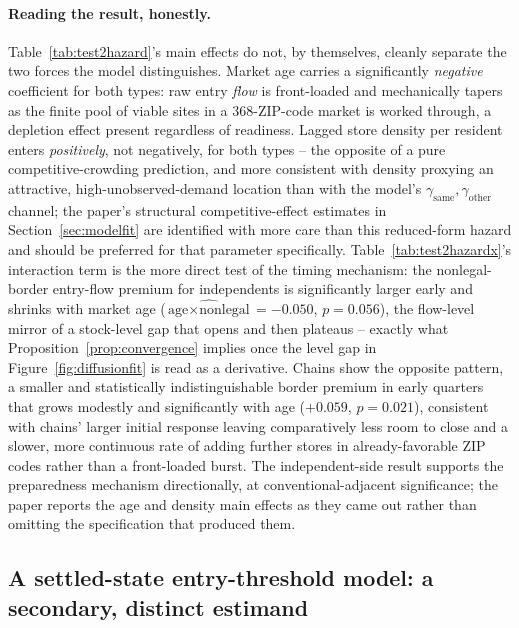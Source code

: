 \documentclass[english,12pt]{article}
\begin{document}
\paragraph{Reading the result, honestly.} Table~\ref{tab:test2hazard}'s main effects do not, by themselves, cleanly separate the two forces the model distinguishes. Market age carries a significantly \emph{negative} coefficient for both types: raw entry \emph{flow} is front-loaded and mechanically tapers as the finite pool of viable sites in a 368-ZIP-code market is worked through, a depletion effect present regardless of readiness. Lagged store density per resident enters \emph{positively}, not negatively, for both types -- the opposite of a pure competitive-crowding prediction, and more consistent with density proxying an attractive, high-unobserved-demand location than with the model's $\gamma_{\text{same}},\gamma_{\text{other}}$ channel; the paper's structural competitive-effect estimates in Section~\ref{sec:modelfit} are identified with more care than this reduced-form hazard and should be preferred for that parameter specifically. Table~\ref{tab:test2hazardx}'s interaction term is the more direct test of the timing mechanism: the nonlegal-border entry-flow premium for independents is significantly larger early and shrinks with market age ($\widehat{\text{age}\times\text{nonlegal}}=-0.050$, $p=0.056$), the flow-level mirror of a stock-level gap that opens and then plateaus -- exactly what Proposition~\ref{prop:convergence} implies once the level gap in Figure~\ref{fig:diffusionfit} is read as a derivative. Chains show the opposite pattern, a smaller and statistically indistinguishable border premium in early quarters that grows modestly and significantly with age ($+0.059$, $p=0.021$), consistent with chains' larger initial response leaving comparatively less room to close and a slower, more continuous rate of adding further stores in already-favorable ZIP codes rather than a front-loaded burst. The independent-side result supports the preparedness mechanism directionally, at conventional-adjacent significance; the paper reports the age and density main effects as they came out rather than omitting the specification that produced them.

\subsection{A settled-state entry-threshold model: a secondary, distinct estimand}
\label{sec:settledgame}
\end{document}

